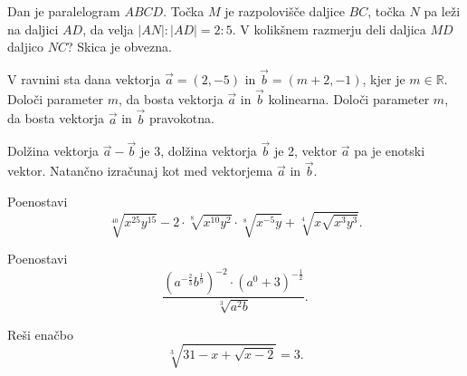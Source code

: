 \documentclass{izpit}
\begin{document}
\naloga[\tocke{5}]
  Dan je paralelogram $ABCD$. Točka $M$ je razpolovišče daljice $BC$, točka $N$ pa leži na daljici $AD$, da velja $|AN|:|AD|=2:5$. V kolikšnem razmerju deli daljica $MD$ daljico $NC$? Skica je obvezna.



\naloga[\tocke{6}]
  V ravnini sta dana vektorja $\vec{a}=(2,-5)$ in $\vec{b}=(m+2,-1)$, kjer je $m\in\mathbb{R}$.
  \podnaloga[3]
  Določi parameter $m$, da bosta vektorja $\vec{a}$ in $\vec{b}$ kolinearna.
  \prostor[2]
  \podnaloga[3]
  Določi parameter $m$, da bosta vektorja $\vec{a}$ in $\vec{b}$ pravokotna.
  \prostor[2]

\naloga*[\tocke{5}]
  Dolžina vektorja $\vec{a}-\vec{b}$ je 3, dolžina vektorja $\vec{b}$ je 2, vektor $\vec{a}$ pa je enotski vektor. Natančno izračunaj kot med vektorjema $\vec{a}$ in $\vec{b}$.
  \prostor[5]

\naloga[\tocke{5}]
  Poenostavi%
  \[\sqrt[40]{x^{25}y^{15}}-2\cdot \sqrt[8]{x^{10}y^{2}}\cdot\sqrt[8]{x^{-5}y}+\sqrt[4]{x\sqrt{x^3 y^3}}.\]
  \prostor[1]


\naloga*[\tocke{4}]%
  Poenostavi
  \[\frac{\left(a^{-\frac{2}{3}}b^{\frac{1}{9}}\right)^{-2}\cdot\left(a^0 +3\right)^{-\frac{1}{2}}}{\sqrt[3]{a^2 b}}.\]
  \prostor[1]

\naloga[\tocke{5}]
  Reši enačbo
  \[\sqrt[3]{31-x+\sqrt{x-2}}=3.\]
\end{document}

